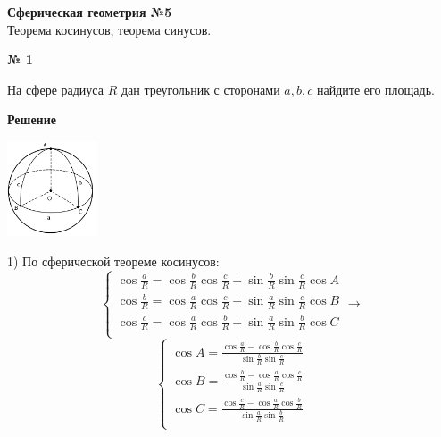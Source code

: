 


    \begin{center}
        \textbf{Сферическая геометрия №5}\\
        Теорема косинусов, теорема синусов.
    \end{center}

    \begin{center}
        \textbf{№ 1}
    \end{center}

    На сфере радиуса $R$ дан треугольник с сторонами $a, b, c$ найдите его площадь.

    \textbf{Решение}\\

    \begin{center}
        \includegraphics[width=0.2\textwidth]{images/img3}\\
    \end{center}

    1) По сферической теореме косинусов:
    \[
        \begin{cases}
            \cos \frac{a}{R} = \cos \frac{b}{R}\cos\frac{c}{R} + \sin \frac{b}{R}\sin\frac{c}{R}\cos A\\
            \cos \frac{b}{R} = \cos \frac{a}{R}\cos\frac{c}{R} + \sin \frac{a}{R}\sin\frac{c}{R}\cos B\\
            \cos \frac{c}{R} = \cos \frac{a}{R}\cos\frac{b}{R} + \sin \frac{a}{R}\sin\frac{b}{R}\cos C\\
        \end{cases}
        \rightarrow
    \]
    \[
        \begin{cases}
            \cos A = \frac{\cos \frac{a}{R} - \cos \frac{b}{R}\cos\frac{c}{R}}{\sin \frac{b}{R}\sin\frac{c}{R}}\\
            \cos B = \frac{\cos \frac{b}{R} - \cos \frac{a}{R}\cos\frac{c}{R}}{\sin \frac{a}{R}\sin\frac{c}{R}}\\
            \cos C = \frac{\cos \frac{c}{R} - \cos \frac{a}{R}\cos\frac{b}{R}}{\sin \frac{a}{R}\sin\frac{b}{R}}\\
        \end{cases}
    \]

